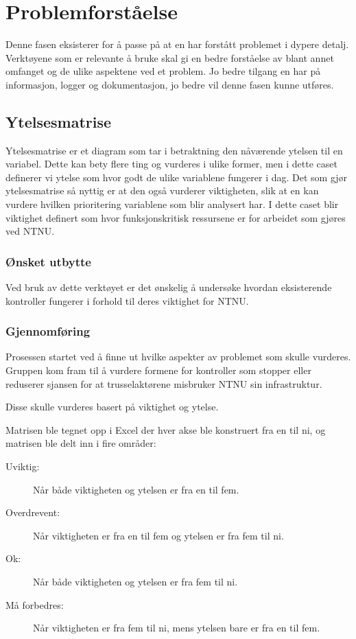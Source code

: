 \chapter{Problemforståelse}
Denne fasen eksisterer for å passe på at en har forstått problemet i dypere detalj. Verktøyene som er relevante å bruke skal gi en bedre forståelse av blant annet omfanget og de ulike aspektene ved et problem. Jo bedre tilgang en har på informasjon, logger og dokumentasjon, jo bedre vil denne fasen kunne utføres. 

\section{Ytelsesmatrise}
Ytelsesmatrise er et diagram som tar i betraktning den nåværende ytelsen til en variabel. Dette kan bety flere ting og vurderes i ulike former, men i dette caset definerer vi ytelse som hvor godt de ulike variablene fungerer i dag. Det som gjør ytelsesmatrise så nyttig er at den også vurderer viktigheten, slik at en kan vurdere hvilken prioritering variablene som blir analysert har. I dette caset blir viktighet definert som hvor funksjonskritisk ressursene er for arbeidet som gjøres ved NTNU.

\subsection{Ønsket utbytte}
Ved bruk av dette verktøyet er det ønskelig å undersøke hvordan eksisterende kontroller fungerer i forhold til deres viktighet for NTNU. 

\subsection{Gjennomføring}
Prosessen startet ved å finne ut hvilke aspekter av problemet som skulle vurderes. Gruppen kom fram til å vurdere formene for kontroller som stopper eller reduserer sjansen for at trusselaktørene misbruker NTNU sin infrastruktur. 

Disse skulle vurderes basert på viktighet og ytelse. 

Matrisen ble tegnet opp i Excel der hver akse ble konstruert fra en til ni, og matrisen ble delt inn i fire områder:
\begin{description}
    \item[Uviktig:] Når både viktigheten og ytelsen er fra en til fem.
    \item[Overdrevent:] Når viktigheten er fra en til fem og ytelsen er fra fem til ni.
    \item[Ok:] Når både viktigheten og ytelsen er fra fem til ni.
    \item[Må forbedres:] Når viktigheten er fra fem til ni, mens ytelsen bare er fra en til fem.
\end{description}

